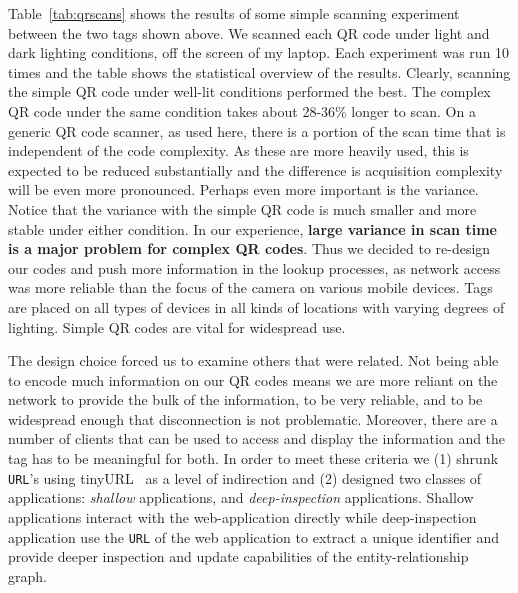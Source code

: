 Table~\ref{tab:qrscans} shows the results of some simple scanning experiment between the two tags
shown above.  We scanned each QR code under light and dark lighting conditions, off the screen of my laptop.
Each experiment was run 10 times and the table shows the statistical
overview of the results. 
Clearly, scanning the simple QR code under well-lit conditions
performed the best.  The complex QR code under the same condition takes about 28-36\% longer to scan.
On a generic QR code scanner, as used here, there is a portion of the
scan time that is independent of the code complexity.  As these are
more heavily used, this is expected to be reduced substantially and
the difference is acquisition complexity will be even more pronounced.
Perhaps even more important is the variance.  Notice that the variance with the simple QR code is much smaller and
more stable under either condition.  In our experience, {\bf large variance in scan time is a major
problem for complex QR codes}.  Thus we decided to re-design our codes and push more information in the lookup
processes, as network access was more reliable than the focus of the camera on various mobile devices.
Tags are placed on all types of devices in all kinds of locations with varying degrees of lighting.
Simple QR codes are vital for widespread use.

The design choice forced us to examine others that were related.  Not being able to encode much information on 
our QR codes means we are more reliant on the network to provide the bulk of the information, to be very reliable,
and to be widespread enough that disconnection is not problematic.  Moreover, there are a number of clients
that can be used to access and display the information and the tag has to be meaningful for both.
In order to meet these criteria we (1) shrunk {\tt URL}'s using tinyURL~\cite{tinyurl} as a level of 
indirection and 
(2) designed two classes of applications: \emph{shallow} applications, and \emph{deep-inspection} applications.  Shallow
applications interact with the web-application directly while deep-inspection application use
the {\tt URL} of the web application to extract a unique identifier and provide deeper inspection
and update capabilities of the entity-relationship graph.

